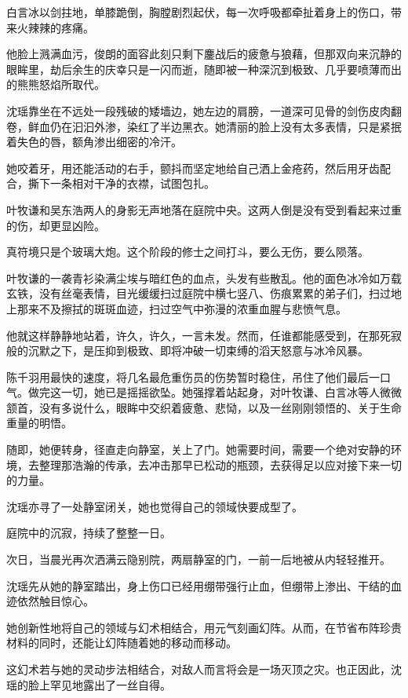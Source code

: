 白言冰以剑拄地，单膝跪倒，胸膛剧烈起伏，每一次呼吸都牵扯着身上的伤口，带来火辣辣的疼痛。

他脸上溅满血污，俊朗的面容此刻只剩下鏖战后的疲惫与狼藉，但那双向来沉静的眼眸里，劫后余生的庆幸只是一闪而逝，随即被一种深沉到极致、几乎要喷薄而出的熊熊怒焰所取代。

沈瑶靠坐在不远处一段残破的矮墙边，她左边的肩膀，一道深可见骨的剑伤皮肉翻卷，鲜血仍在汩汩外渗，染红了半边黑衣。她清丽的脸上没有太多表情，只是紧抿着失色的唇，额角渗出细密的冷汗。

她咬着牙，用还能活动的右手，颤抖而坚定地给自己洒上金疮药，然后用牙齿配合，撕下一条相对干净的衣襟，试图包扎。

叶牧谦和吴东浩两人的身影无声地落在庭院中央。这两人倒是没有受到看起来过重的伤，却更显凶险。

真符境只是个玻璃大炮。这个阶段的修士之间打斗，要么无伤，要么陨落。

叶牧谦的一袭青衫染满尘埃与暗红色的血点，头发有些散乱。他的面色冰冷如万载玄铁，没有丝毫表情，目光缓缓扫过庭院中横七竖八、伤痕累累的弟子们，扫过地上那来不及擦拭的斑斑血迹，扫过空气中弥漫的浓重血腥与悲愤气息。

他就这样静静地站着，许久，许久，一言未发。然而，任谁都能感受到，在那死寂般的沉默之下，是压抑到极致、即将冲破一切束缚的滔天怒意与冰冷风暴。

陈千羽用最快的速度，将几名最危重伤员的伤势暂时稳住，吊住了他们最后一口气。做完这一切，她已是摇摇欲坠。她强撑着站起身，对叶牧谦、白言冰等人微微颔首，没有多说什么，眼眸中交织着疲惫、悲恸，以及一丝刚刚领悟的、关于生命重量的明悟。

随即，她便转身，径直走向静室，关上了门。她需要时间，需要一个绝对安静的环境，去整理那浩瀚的传承，去冲击那早已松动的瓶颈，去获得足以应对接下来一切的力量。

沈瑶亦寻了一处静室闭关，她也觉得自己的领域快要成型了。

\vspace{2em}

庭院中的沉寂，持续了整整一日。

次日，当晨光再次洒满云隐别院，两扇静室的门，一前一后地被从内轻轻推开。

沈瑶先从她的静室踏出，身上伤口已经用绷带强行止血，但绷带上渗出、干结的血迹依然触目惊心。

她创新性地将自己的领域与幻术相结合，用元气刻画幻阵。从而，在节省布阵珍贵材料的同时，还能让幻阵随着她的移动而移动。

这幻术若与她的灵动步法相结合，对敌人而言将会是一场灭顶之灾。也正因此，沈瑶的脸上罕见地露出了一丝自得。

